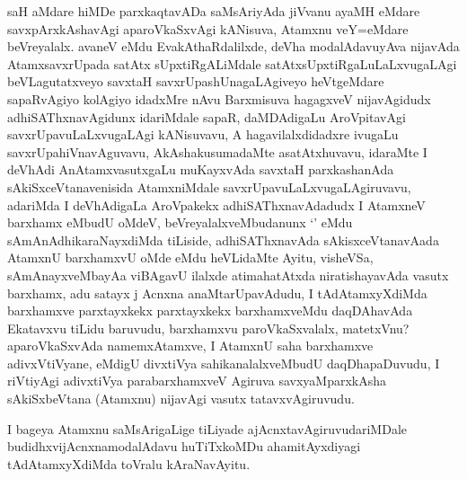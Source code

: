 \begin{artha}
saH aMdare hiMDe parxkaqtavADa saMsAriyAda jiVvanu ayaMH eMdare savxpArxkAshavAgi aparoVkaSxvAgi kANisuva, Atamxnu veY=eMdare beVreyalalx. avaneV eMdu EvakAthaRdalilxde, deVha modalAdavuyAva nijavAda AtamxsavxrUpada satAtx sUpxtiRgALiMdale satAtxsUpxtiRgaLuLaLxvugaLAgi beVLagutatxveyo savxtaH savxrUpashUnagaLAgiveyo heVtgeMdare sapaRvAgiyo kolAgiyo idadxMre nAvu Barxmisuva hagagxveV nijavAgidudx adhiSAThxnavAgidunx idariMdale sapaR, daMDAdigaLu AroVpitavAgi savxrUpavuLaLxvugaLAgi kANisuvavu, A hagavilalxdidadxre ivugaLu savxrUpahiVnavAguvavu, AkAshakusumadaMte asatAtxhuvavu, idaraMte I deVhAdi AnAtamxvasutxgaLu muKayxvAda savxtaH parxkashanAda sAkiSxceVtanavenisida AtamxniMdale savxrUpavuLaLxvugaLAgiruvavu, adariMda I deVhAdigaLa AroVpakekx adhiSAThxnavAdadudx I AtamxneV barxhamx eMbudU oMdeV, beVreyalalxveMbudanunx `\stext' eMdu sAmAnAdhikaraNayxdiMda tiLiside, adhiSAThxnavAda sAkisxceVtanavAada AtamxnU barxhamxvU oMde eMdu heVLidaMte Ayitu, visheVSa, sAmAnayxveMbayAa viBAgavU ilalxde atimahatAtxda niratishayavAda vasutx barxhamx, adu satayx j Acnxna anaMtarUpavAdudu, I tAdAtamxyXdiMda barxhamxve parxtayxkekx parxtayxkekx barxhamxveMdu daqDAhavAda Ekatavxvu tiLidu baruvudu, barxhamxvu paroVkaSxvalalx, matetxVnu?  aparoVkaSxvAda namemxAtamxve, I AtamxnU saha barxhamxve adivxVtiVyane, eMdigU divxtiVya sahikanalalxveMbudU daqDhapaDuvudu, I riVtiyAgi adivxtiVya parabarxhamxveV Agiruva savxyaMparxkAsha sAkiSxbeVtana (Atamxnu) nijavAgi vasutx tatavxvAgiruvudu.
\end{artha}
\begin{artha}
I bageya Atamxnu saMsArigaLige tiLiyade ajAcnxtavAgiruvudariMDale budidhxvijAcnxnamodalAdavu huTiTxkoMDu ahamitAyxdiyagi tAdAtamxyXdiMda toVralu kAraNavAyitu.
\end{artha}

